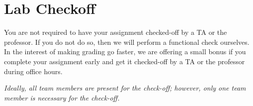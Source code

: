 \section*{Lab Checkoff}

You are not required to have your assignment checked-off by a TA or the
professor. If you do not do so, then we will perform a functional check
ourselves. In the interest of making grading go faster, we are offering a small
bonus %
if you complete your assignment early and get it checked-off by a TA or the
professor during office hours.

\textit{Ideally, all team members are present for the check-off; however, only
one team member is necessary for the check-off.}

